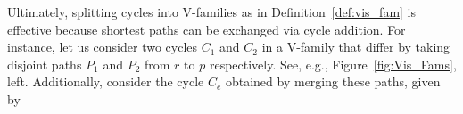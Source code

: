 \documentclass[fleqn,11pt]{article}
\begin{document}



Ultimately, splitting cycles into V-families as in Definition~\ref{def:vis_fam} is effective because shortest paths can be exchanged via cycle addition. For instance, let us consider two cycles $C_1$ and $C_2$ in a V-family that differ by taking disjoint paths $P_1$ and $P_2$ from $r$ to $p$ respectively. See, e.g., Figure~\ref{fig:Vis_Fams}, left. Additionally, consider the cycle $C_e$ obtained by merging these paths, given by%
\end{document}
